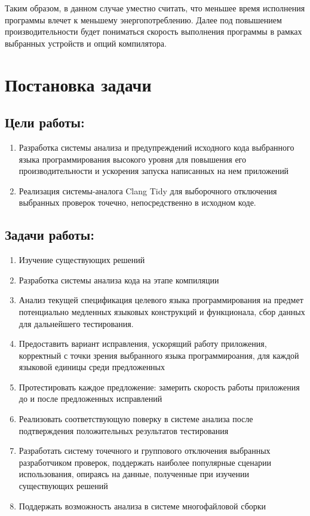 \documentclass{mipt-thesis-bs}
\begin{document}
Таким образом, в данном случае уместно считать, что меньшее время исполнения программы
влечет к меньшему энергопотреблению. Далее под повышением производительности будет пониматься скорость выполнения
программы в рамках выбранных устройств и опций компилятора.
\chapter{Постановка задачи}

\section{Цели работы:}

\begin{enumerate}
    \item Разработка системы анализа и предупреждений исходного кода выбранного языка программирования высокого уровня 
для повышения его производительности и ускорения запуска написанных на нем приложений
    \item Реализация системы-аналога Clang Tidy для выборочного отключения выбранных проверок точечно, непосредственно в исходном коде.
\end{enumerate}

\section{Задачи работы:}

\begin{enumerate}
    \item Изучение существующих решений
    \item Разработка системы анализа кода на этапе компиляции
    \item Анализ текущей спецификация целевого языка программирования на предмет потенциально медленных языковых конструкций и функционала, 
    сбор данных для дальнейшего тестирования.
    \item Предоставить вариант исправления, ускорящий работу приложения, корректный с точки 
    зрения выбранного языка программироания, для каждой языковой единицы среди предложенных
    \item Протестировать каждое предложение: замерить скорость работы приложения до и после предложенных исправлений
    \item Реализовать соответствующую поверку в системе анализа после подтверждения положительных результатов тестирования
    \item Разработать систему точечного и группового отключения выбранных разработчиком проверок, поддержать наиболее популярные сценарии 
    использования, опираясь на данные, полученные при изучении существующих решений
    \item Поддержать возможность анализа в системе многофайловой сборки

\end{enumerate}
\end{document}
